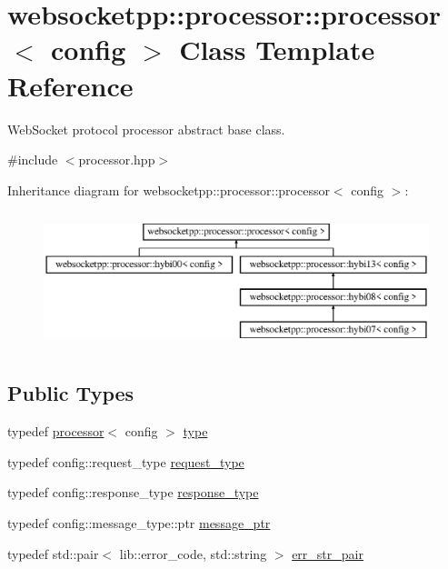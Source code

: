 \hypertarget{classwebsocketpp_1_1processor_1_1processor}{}\section{websocketpp\+:\+:processor\+:\+:processor$<$ config $>$ Class Template Reference}
\label{classwebsocketpp_1_1processor_1_1processor}


Web\+Socket protocol processor abstract base class.  




{\ttfamily \#include $<$processor.\+hpp$>$}

Inheritance diagram for websocketpp\+:\+:processor\+:\+:processor$<$ config $>$\+:\begin{figure}[H]
\begin{center}
\leavevmode
\includegraphics[height=4.000000cm]{classwebsocketpp_1_1processor_1_1processor}
\end{center}
\end{figure}
\subsection*{Public Types}
\begin{DoxyCompactItemize}
\item 
typedef \hyperlink{classwebsocketpp_1_1processor_1_1processor}{processor}$<$ config $>$ \hyperlink{classwebsocketpp_1_1processor_1_1processor_ae897e7144ad7b9ece176d13ea5078ae2}{type}
\item 
typedef config\+::request\+\_\+type \hyperlink{classwebsocketpp_1_1processor_1_1processor_ac3926102ce2422e6b40ccea41e764233}{request\+\_\+type}
\item 
typedef config\+::response\+\_\+type \hyperlink{classwebsocketpp_1_1processor_1_1processor_aa8d088af1bdb838f1e86df6cf4395981}{response\+\_\+type}
\item 
typedef config\+::message\+\_\+type\+::ptr \hyperlink{classwebsocketpp_1_1processor_1_1processor_a7f189eb2eb87b7293d46026fa0950635}{message\+\_\+ptr}
\item 
typedef std\+::pair$<$ lib\+::error\+\_\+code, std\+::string $>$ \hyperlink{classwebsocketpp_1_1processor_1_1processor_aa17cb49b100ed209ca8650895812be11}{err\+\_\+str\+\_\+pair}
\end{DoxyCompactItemize}
